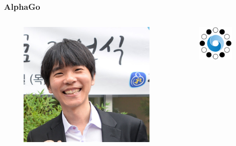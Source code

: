 \documentclass[12pt, aspectratio=169]{beamer}
\begin{document}
\begin{frame}
	\frametitle{AlphaGo}
	\begin{columns}[c]
		\begin{figure}
			\includegraphics[width=1\linewidth]{Lee_Se-Dol.jpg}
		\end{figure}
		\begin{figure}
			\includegraphics[width=1\linewidth]{Alphago_logo_cropped}
		\end{figure}
	\end{columns}
\end{frame}
\end{document}
